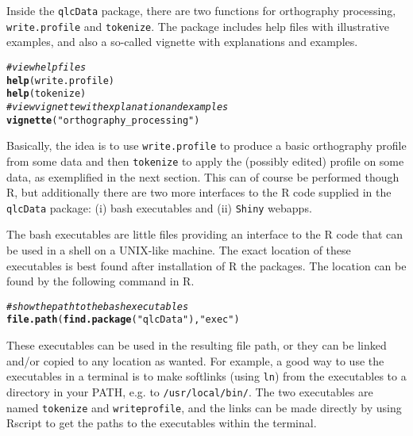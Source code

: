 \documentclass[output=inprep,
		biblatex
		]{LSP/langsci}\usepackage[]{graphicx}\usepackage[]{color}
\makeatletter
\newcommand{\hlstr}[1]{\textcolor[rgb]{0.192,0.494,0.8}{#1}}%
\newcommand{\hlcom}[1]{\textcolor[rgb]{0.678,0.584,0.686}{\textit{#1}}}%
\newcommand{\hlstd}[1]{\textcolor[rgb]{0.345,0.345,0.345}{#1}}%
\newcommand{\hlkwd}[1]{\textcolor[rgb]{0.737,0.353,0.396}{\textbf{#1}}}%
\newenvironment{kframe}{%
 \def\at@end@of@kframe{}%
 \ifinner\ifhmode%
  \def\at@end@of@kframe{\end{minipage}}%
  \begin{minipage}{\columnwidth}%
 \fi\fi%
 \def\FrameCommand##1{\hskip\@totalleftmargin \hskip-\fboxsep
 \colorbox{shadecolor}{##1}\hskip-\fboxsep
     \hskip-\linewidth \hskip-\@totalleftmargin \hskip\columnwidth}%
 \MakeFramed {\advance\hsize-\width
   \@totalleftmargin\z@ \linewidth\hsize
   \@setminipage}}%
 {\par\unskip\endMakeFramed%
 \at@end@of@kframe}
\newenvironment{knitrout}{}{} %
\makeatother
\begin{document}
Inside the \texttt{qlcData} package, there are two functions for
orthography processing, \texttt{write.profile} and \texttt{tokenize}. The package includes
help files with illustrative examples, and also a so-called vignette with
explanations and examples.

\begin{knitrout}\footnotesize
{}\color{fgcolor}\begin{kframe}
\begin{alltt}
\hlcom{# view help files}
\hlkwd{help}\hlstd{(write.profile)}
\hlkwd{help}\hlstd{(tokenize)}
\hlcom{# view vignette with explanation and examples}
\hlkwd{vignette}\hlstd{(}\hlstr{"orthography_processing"}\hlstd{)}
\end{alltt}
\end{kframe}
\end{knitrout}

Basically, the idea is to use \texttt{write.profile} to produce a
basic orthography profile from some data and then \texttt{tokenize} to apply the
(possibly edited) profile on some data, as exemplified in the next section. This
can of course be performed though R, but additionally there are two more
interfaces to the R code supplied in the \texttt{qlcData} package: (i) bash
executables and (ii) \texttt{Shiny} webapps.

The bash executables are little files providing an interface to the R code that
can be used in a shell on a UNIX-like machine. The exact location of these
executables is best found after installation of R the packages. The
location can be found by the following command in R. 

\begin{knitrout}\footnotesize
{}\color{fgcolor}\begin{kframe}
\begin{alltt}
\hlcom{# show the path to the bash executables}
\hlkwd{file.path}\hlstd{(}\hlkwd{find.package}\hlstd{(}\hlstr{"qlcData"}\hlstd{),} \hlstr{"exec"}\hlstd{)}
\end{alltt}
\end{kframe}
\end{knitrout}

These executables can be 
used in the resulting file path, or they can be linked and/or copied to any location as wanted. 
For example, a good way to use the executables in a terminal is to
make softlinks (using \texttt{ln}) from the executables to a directory in your
PATH, e.g. to \texttt{/usr/local/bin/}. The two executables are named
\texttt{tokenize} and \texttt{writeprofile}, and the links can be made directly 
by using Rscript to get the paths to the executables within the terminal.
\end{document}
